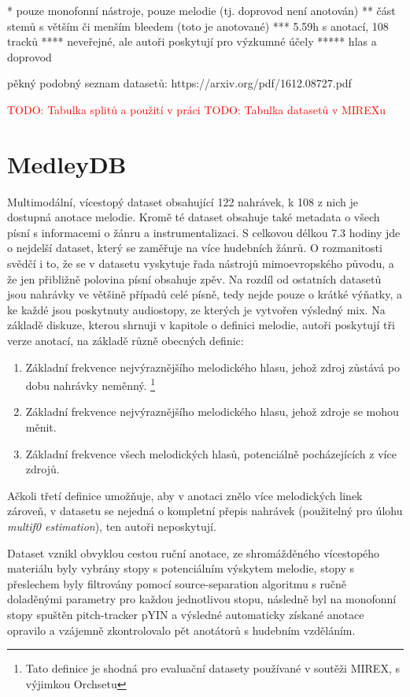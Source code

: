 * pouze monofonní nástroje, pouze melodie (tj. doprovod není anotován)
** část stemů s větším či menším bleedem (toto je anotované)
*** 5.59h s anotací, 108 tracků
**** neveřejné, ale autoři poskytují pro výzkumné účely
***** hlas a doprovod

pěkný podobný seznam datasetů: https://arxiv.org/pdf/1612.08727.pdf

\textcolor{red}{TODO: Tabulka splitů a použití v práci}
\textcolor{red}{TODO: Tabulka datasetů v MIREXu}



\section{MedleyDB}

\cite{Bittner2014}

Multimodální, vícestopý dataset obsahující 122 nahrávek, k 108 z nich je dostupná anotace melodie. Kromě té dataset obsahuje také metadata o všech písní s informacemi o žánru a instrumentalizaci. S celkovou délkou 7.3 hodiny jde o nejdelší dataset, který se zaměřuje na více hudebních žánrů. O rozmanitosti svědčí i to, že se v datasetu vyskytuje řada nástrojů mimoevropského původu, a že jen přibližně polovina písní obsahuje zpěv. Na rozdíl od ostatních datasetů jsou nahrávky ve většině případů celé písně, tedy nejde pouze o krátké výňatky, a ke každé jsou poskytnuty audiostopy, ze kterých je vytvořen výsledný mix.
Na základě diskuze, kterou shrnuji v kapitole o definici melodie, autoři poskytují tři verze anotací, na základě různě obecných definic:

\begin{enumerate}
    \item Základní frekvence nejvýraznějšího melodického hlasu, jehož zdroj zůstává po dobu nahrávky neměnný. \footnote{Tato definice je shodná pro evaluační datasety používané v soutěži MIREX, s výjimkou Orchsetu}
    \item Základní frekvence nejvýraznějšího melodického hlasu, jehož zdroje se mohou měnit.
    \item Základní frekvence všech melodických hlasů, potenciálně pocházejících z více zdrojů.
\end{enumerate}

Ačkoli třetí definice umožňuje, aby v anotaci znělo více melodických linek zároveň, v datasetu se nejedná o kompletní přepis nahrávek (použitelný pro úlohu \textit{multif0 estimation}), ten autoři neposkytují.

Dataset vznikl obvyklou cestou ruční anotace, ze shromážděného vícestopého materiálu byly vybrány stopy s potenciálním výskytem melodie, stopy s přeslechem byly filtrovány pomocí source-separation algoritmu s ručně doladěnými parametry pro každou jednotlivou stopu, následně byl na monofonní stopy spuštěn pitch-tracker pYIN a výsledné automaticky získané anotace opravilo a vzájemně zkontrolovalo pět anotátorů s hudebním vzděláním. 

